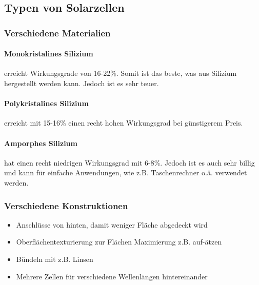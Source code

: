 \subsection{Typen von Solarzellen}

	\subsubsection{Verschiedene Materialien}
		\paragraph{Monokristalines Silizium} erreicht Wirkungsgrade von 16-22\%. Somit ist das beste, was aus Silizium hergestellt werden kann. Jedoch ist es sehr teuer.
		
		\paragraph{Polykristalines Silizium} erreicht mit 15-16\% einen recht hohen Wirkungsgrad bei günstigerem Preis.

		\paragraph{Amporphes Silizium} hat einen recht niedrigen Wirkungsgrad mit 6-8\%. Jedoch ist es auch sehr billig und kann für einfache Anwendungen, wie z.B. Taschenrechner o.ä. verwendet werden.

	\subsubsection{Verschiedene Konstruktionen}
		\begin{itemize}
			\item Anschlüsse von hinten, damit weniger Fläche abgedeckt wird
			\item Oberflächentexturierung zur Flächen Maximierung z.B. auf-ätzen
			\item Bündeln mit z.B. Linsen
			\item Mehrere Zellen für verschiedene Wellenlängen hintereinander
		\end{itemize}
		
